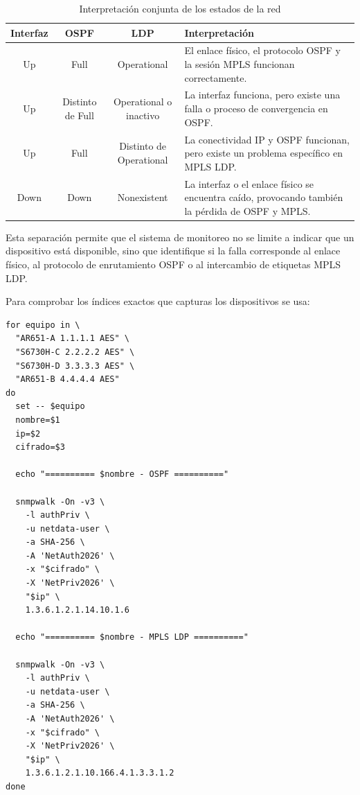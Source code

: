 \begin{table}[H]
\centering
\caption{Interpretación conjunta de los estados de la red}
\label{tab:interpretacion-ospf-mpls}
\begin{tabular}{c|c|c|p{7cm}}
\hline
\textbf{Interfaz} & \textbf{OSPF} & \textbf{LDP} & \textbf{Interpretación} \\ \hline

Up & Full & Operational &
El enlace físico, el protocolo OSPF y la sesión MPLS funcionan correctamente. \\ \hline

Up & Distinto de Full & Operational o inactivo &
La interfaz funciona, pero existe una falla o proceso de convergencia en OSPF. \\ \hline

Up & Full & Distinto de Operational &
La conectividad IP y OSPF funcionan, pero existe un problema específico en MPLS LDP. \\ \hline

Down & Down & Nonexistent &
La interfaz o el enlace físico se encuentra caído, provocando también la pérdida de OSPF y MPLS. \\ \hline

\end{tabular}
\end{table}

Esta separación permite que el sistema de monitoreo no se limite a indicar que un dispositivo está disponible, sino que identifique si la falla corresponde al enlace físico, al protocolo de enrutamiento OSPF o al intercambio de etiquetas MPLS LDP.

Para comprobar los índices exactos que capturas los dispositivos se usa:

\begin{lstlisting}[style=terminal]
for equipo in \
  "AR651-A 1.1.1.1 AES" \
  "S6730H-C 2.2.2.2 AES" \
  "S6730H-D 3.3.3.3 AES" \
  "AR651-B 4.4.4.4 AES"
do
  set -- $equipo
  nombre=$1
  ip=$2
  cifrado=$3

  echo "========== $nombre - OSPF =========="

  snmpwalk -On -v3 \
    -l authPriv \
    -u netdata-user \
    -a SHA-256 \
    -A 'NetAuth2026' \
    -x "$cifrado" \
    -X 'NetPriv2026' \
    "$ip" \
    1.3.6.1.2.1.14.10.1.6

  echo "========== $nombre - MPLS LDP =========="

  snmpwalk -On -v3 \
    -l authPriv \
    -u netdata-user \
    -a SHA-256 \
    -A 'NetAuth2026' \
    -x "$cifrado" \
    -X 'NetPriv2026' \
    "$ip" \
    1.3.6.1.2.1.10.166.4.1.3.3.1.2
done
\end{lstlisting}

